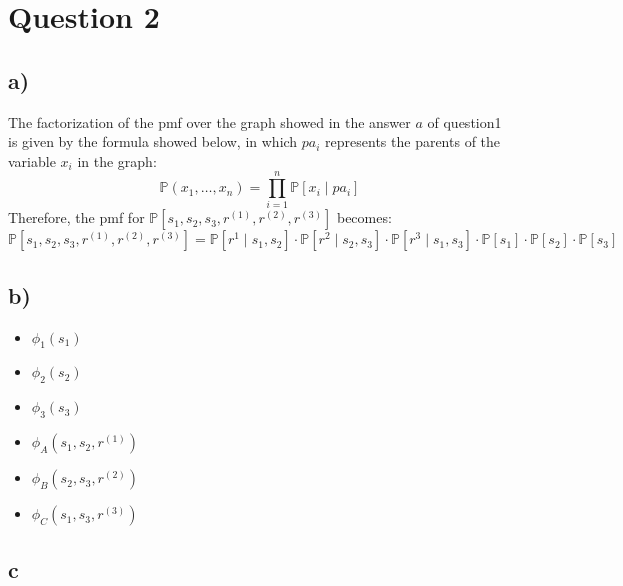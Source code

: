 \documentclass[11pt,a4paper]{article}
\begin{document}
\section*{Question 2}

\subsection*{a)}
The factorization of the pmf over the graph showed in the answer $a$ of question1 is given by the formula showed below, in which $pa_i$ represents the parents of the variable $x_i$ in the graph:
\begin{equation}
\mathbb{P}(x_1, \ldots, x_n) = \prod_{i=1}^{n} \mathbb{P}[x_i \; | \; pa_i]
\end{equation}
Therefore, the pmf for $\mathbb{P}[s_1, s_2, s_3, r^{(1)}, r^{(2)}, r^{(3)}]$ becomes:
\begin{equation}
\mathbb{P}[s_1, s_2, s_3, r^{(1)}, r^{(2)}, r^{(3)}] = \mathbb{P}[r^{1} \; | \; s_1, s_2]\cdot \mathbb{P}[r^{2} \; | \; s_2, s_3] \cdot \mathbb{P}[r^{3} \; | \; s_1, s_3] \cdot \mathbb{P}[s_1] \cdot \mathbb{P}[s_2] \cdot \mathbb{P}[s_3]
\end{equation}

\subsection*{b)}
\begin{itemize}
\item $\phi_1(s_1)$
\item $\phi_2(s_2)$
\item $\phi_3(s_3)$
\item $\phi_A(s_1, s_2, r^{(1)})$
\item $\phi_B(s_2, s_3, r^{(2)})$
\item $\phi_C(s_1, s_3, r^{(3)})$
\end{itemize}

\subsection*{c}
\end{document}
